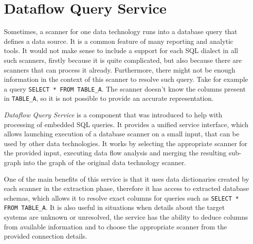 \section{Dataflow Query Service}
\label{section:DQS}

Sometimes, a scanner for one data technology runs into a database query that defines a data source. It is a common feature of many reporting and analytic tools. It would not make sense to include a support for each SQL dialect in all such scanners, firstly because it is quite complicated, but also because there are scanners that can process it already. Furthermore, there might not be enough information in the context of this scanner to resolve such query. Take for example a query \texttt{SELECT * FROM TABLE\_A}. The scanner doesn't know the columns present in \texttt{TABLE\_A}, so it is not possible to provide an accurate representation. 
\par
\textit{Dataflow Query Service} is a component that was introduced to help with processing of embedded SQL queries. It provides a unified service interface, which allows launching execution of a database scanner on a small input, that can be used by other data technologies. It works by selecting the appropriate scanner for the provided input, executing data flow analysis and merging the resulting sub-graph into the graph of the original data technology scanner.
\par
One of the main benefits of this service is that it uses data dictionaries created by each scanner in the extraction phase, therefore it has access to extracted database schemas, which allows it to resolve exact columns for queries such as \texttt{SELECT * FROM TABLE\_A}. It is also useful in situations when details about the target systems are unknown or unresolved, the service has the ability to deduce columns from available information and to choose the appropriate scanner from the provided connection details.

